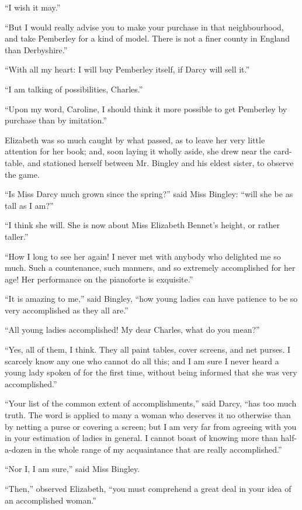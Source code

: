\documentclass[12pt]{book}
\begin{document}
``I wish it may.''

``But I would really advise you to make your purchase in that neighbourhood, and take Pemberley for a kind of model. There is not a finer county in England than Derbyshire.''

``With all my heart: I will buy Pemberley itself, if Darcy will sell it.''

``I am talking of possibilities, Charles.''

``Upon my word, Caroline, I should think it more possible to get Pemberley by purchase than by imitation.''

Elizabeth was so much caught by what passed, as to leave her very little attention for her book; and, soon laying it wholly aside, she drew near the card-table, and stationed herself between Mr. Bingley and his eldest sister, to observe the game.

``Is Miss Darcy much grown since the spring?'' said Miss Bingley: ``will she be as tall as I am?''

``I think she will. She is now about Miss Elizabeth Bennet's height, or rather taller.''

``How I long to see her again! I never met with anybody who delighted me so much. Such a countenance, such manners, and so extremely accomplished for her age! Her performance on the pianoforte is exquisite.''

``It is amazing to me,'' said Bingley, ``how young ladies can have patience to be so very accomplished as they all are.''

``All young ladies accomplished! My dear Charles, what do you mean?''

``Yes, all of them, I think. They all paint tables, cover screens, and net purses. I scarcely know any one who cannot do all this; and I am sure I never heard a young lady spoken of for the first time, without being informed that she was very accomplished.''

``Your list of the common extent of accomplishments,'' said Darcy, ``has too much truth. The word is applied to many a woman who deserves it no otherwise than by netting a purse or covering a screen; but I am very far from agreeing with you in your estimation of ladies in general. I cannot boast of knowing more than half-a-dozen in the whole range of my acquaintance that are really accomplished.''

``Nor I, I am sure,'' said Miss Bingley.

``Then,'' observed Elizabeth, ``you must comprehend a great deal in your idea of an accomplished woman.''
\end{document}

